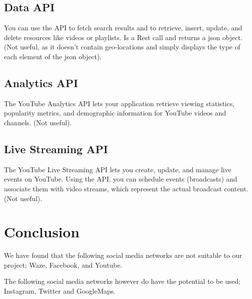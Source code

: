 \documentclass{article}
\begin{document}
\subsection{Data API}
You can use the API to fetch search results and to retrieve, insert, update, and delete resources like videos or playlists. Is a Rest call and returns a json object. (Not useful, as it doesn't contain geo-locations and simply displays the type of each element of the json object).
\subsection{Analytics API}
The YouTube Analytics API lets your application retrieve viewing statistics, popularity metrics, and demographic information for YouTube videos and channels. (Not useful).
\subsection{Live Streaming API}
The YouTube Live Streaming API lets you create, update, and manage live events on YouTube. Using the API, you can schedule events (broadcasts) and associate them with video streams, which represent the actual broadcast content. (Not useful).

\section{Conclusion}
We have found that the following social media networks are not suitable to our project; Waze, Facebook, and Youtube.

The following social media networks however do have the potential to be used; Instagram, Twitter and GoogleMaps.
\end{document}
